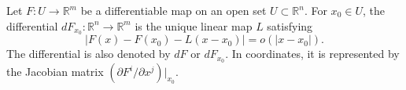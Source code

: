 Let $F: U \to \mathbb{R}^m$ be a differentiable map on an open set $U \subset \mathbb{R}^n$. For $x_0 \in U$, the differential $dF_{x_0}: \mathbb{R}^n \to \mathbb{R}^m$ is the unique linear map $L$ satisfying
$$|F(x) - F(x_0) - L(x - x_0)| = o(|x - x_0|).$$
The differential is also denoted by $dF$ or $dF_{x_0}$. In coordinates, it is represented by the Jacobian matrix $(\partial F^i/\partial x^j)|_{x_0}$.